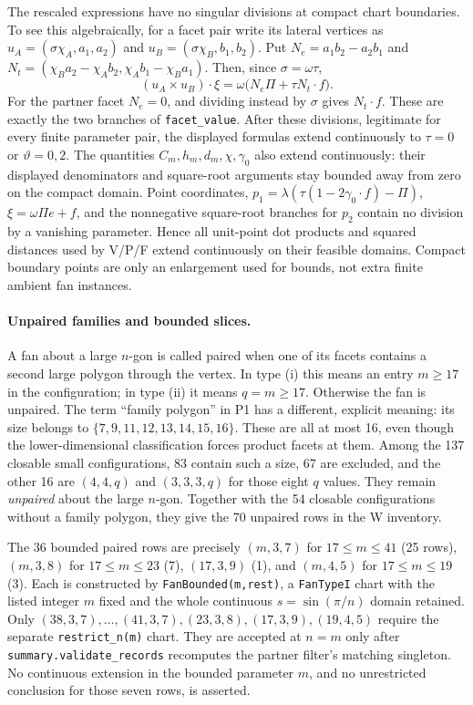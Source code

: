 \documentclass[11pt]{article}
\theoremstyle{definition}
\theoremstyle{remark}
\begin{document}
The rescaled expressions have no singular divisions at compact chart
boundaries. To see this algebraically, for a facet pair write its lateral
vertices as $u_A=(\sigma\chi_A,a_1,a_2)$ and
$u_B=(\sigma\chi_B,b_1,b_2)$. Put
$N_e=a_1b_2-a_2b_1$ and
$N_t=(\chi_Ba_2-\chi_Ab_2,\chi_Ab_1-\chi_Ba_1)$.
Then, since $\sigma=\omega\tau$,
\[
 (u_A\times u_B)\cdot\xi
 =\omega\bigl(N_e\Pi+\tau N_t\cdot f\bigr).
\]
For the partner facet $N_e=0$, and dividing instead by $\sigma$
gives $N_t\cdot f$. These are exactly the two branches of
\texttt{facet\_value}. After these divisions, legitimate for every
finite parameter pair, the displayed formulas extend continuously to
$\tau=0$ or $\vartheta=0,2$.
The quantities $C_m,h_m,d_m,\chi,\gamma_0$ also extend continuously:
their displayed denominators and square-root arguments stay bounded
away from zero on the compact domain. Point coordinates,
$p_1=\lambda(\tau(1-2\gamma_0\cdot f)-\Pi)$,
$\xi=\omega\Pi e+f$, and the nonnegative square-root branches for
$p_2$ contain no division by a vanishing parameter. Hence all unit-point
dot products and squared distances used by V/P/F extend continuously on
their feasible domains. Compact boundary points are only an enlargement
used for bounds, not extra finite ambient fan instances.

\paragraph{Unpaired families and bounded slices.}
A fan about a large $n$-gon is called paired when one of its facets
contains a second large polygon through the vertex. In type (i) this
means an entry $m\ge17$ in the configuration; in type (ii) it means
$q=m\ge17$. Otherwise the fan is unpaired.
The term ``family polygon'' in P1 has a different, explicit meaning:
its size belongs to $\{7,9,11,12,13,14,15,16\}$. These are all at most
16, even though the lower-dimensional classification forces product
facets at them. Among the 137 closable small configurations, 83 contain
such a size, 67 are excluded, and the other 16 are
$(4,4,q)$ and $(3,3,3,q)$ for those eight $q$ values. They remain
\emph{unpaired} about the large $n$-gon. Together with the 54 closable
configurations without a family polygon, they give the 70 unpaired
rows in the W inventory.

The 36 bounded paired rows are precisely
$(m,3,7)$ for $17\le m\le41$ (25 rows),
$(m,3,8)$ for $17\le m\le23$ (7),
$(17,3,9)$ (1), and $(m,4,5)$ for $17\le m\le19$ (3).
Each is constructed by \texttt{FanBounded(m,rest)}, a
\texttt{FanTypeI} chart with the listed integer $m$ fixed and the whole
continuous $s=\sin(\pi/n)$ domain retained.
Only $(38,3,7),\ldots,(41,3,7),(23,3,8),(17,3,9),(19,4,5)$ require the
separate \texttt{restrict\_n(m)} chart. They are accepted at $n=m$ only
after \texttt{summary.validate\_records} recomputes the partner filter's
matching singleton. No continuous extension in the bounded parameter
$m$, and no unrestricted conclusion for those seven rows, is asserted.
\end{document}
